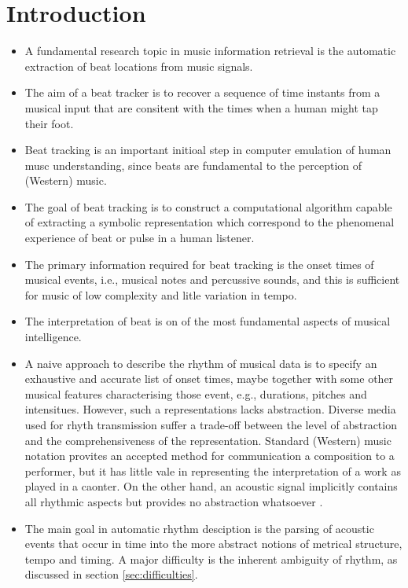 \documentclass{scrartcl}
\begin{document}
\pagestyle{plain}


\tableofcontents
\newpage


\section{Introduction}

\begin{itemize}
\item A fundamental research topic in music information retrieval is the automatic extraction of beat locations from music signals. 
\item The aim of a beat tracker is to recover a sequence of time instants from a musical input that are consitent with the times when a human might tap their foot. \cite{Ellis2007}
\item Beat tracking is an important initioal step in computer emulation of human musc understanding, since beats are fundamental to the perception of (Western) music.
\item The goal of beat tracking is to construct a computational algorithm capable of extracting a symbolic representation which correspond to the phenomenal experience of beat or pulse in a human listener.
\item The primary information required for beat tracking is the onset times of musical events, i.e., musical notes and percussive sounds, and this is sufficient for music of low complexity and litle variation in tempo.
\item The interpretation of beat is on of the most fundamental aspects of musical intelligence.
\item A naive approach to describe the rhythm of musical data is to specify an exhaustive and accurate list of onset times, maybe together with some other musical features characterising those event, e.g., durations, pitches and intensitues. However, such a representations lacks abstraction. Diverse media used for rhyth transmission suffer a trade-off between the level of abstraction and the comprehensiveness of the representation. Standard (Western) music notation provites an accepted method for communication a composition to a performer, but it has little vale in representing the interpretation of a work as played in a caonter. On the other hand, an acoustic signal implicitly contains all rhythmic aspects but provides no abstraction whatsoever \cite{Gouyon2005}.
\item The main goal in automatic rhythm desciption is the parsing of acoustic events that occur in time into the more abstract notions of metrical structure, tempo and timing. A major difficulty is the inherent ambiguity of rhythm, as discussed in section \ref{sec:difficulties}.

\end{itemize}
\end{document}
